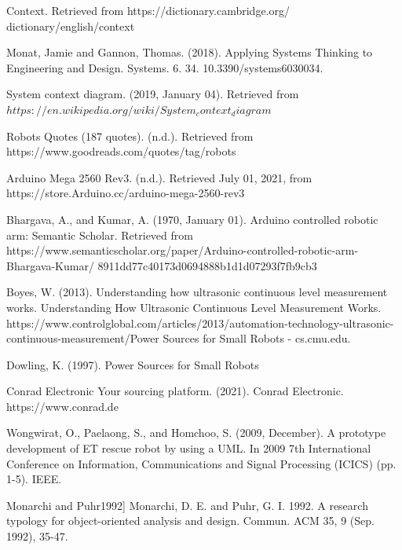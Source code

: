\documentclass[10pt,journal,compsoc]{IEEEtran}
\begin{document}
\begin{thebibliography}{9}

Context. Retrieved from {https://dictionary.cambridge.org/
dictionary/english/context}


Monat, Jamie and Gannon, Thomas. (2018). Applying Systems Thinking to Engineering and Design. Systems. 6. 34. 10.3390/systems6030034.

System context diagram. (2019, January 04). Retrieved from {$https://en.wikipedia.org/wiki/System_context_diagram$}

Robots Quotes (187 quotes). (n.d.). Retrieved from {https://www.goodreads.com/quotes/tag/robots}

Arduino Mega 2560 Rev3. (n.d.). Retrieved July 01, 2021, from https://store.Arduino.cc/arduino-mega-2560-rev3

Bhargava, A., and Kumar, A. (1970, January 01). Arduino controlled robotic arm: Semantic Scholar. Retrieved from https://www.semanticscholar.org/paper/Arduino-controlled-robotic-arm-Bhargava-Kumar/
8911dd77c40173d0694888b1d1d07293f7fb9cb3

Boyes, W. (2013). Understanding how ultrasonic continuous level measurement works. Understanding How Ultrasonic Continuous Level Measurement Works. https://www.controlglobal.com/articles/2013/automation-technology-ultrasonic-continuous-measurement/Power Sources for Small Robots - cs.cmu.edu.

Dowling, K. (1997). Power Sources for Small Robots

Conrad Electronic Your sourcing platform. (2021). Conrad Electronic. https://www.conrad.de

Wongwirat, O., Paelaong, S., and Homchoo, S. (2009, December). A prototype development of ET rescue robot by using a UML. In 2009 7th International Conference on Information, Communications and Signal Processing (ICICS) (pp. 1-5). IEEE.

Monarchi and Puhr1992] Monarchi, D. E. and Puhr, G. I. 1992. A research typology for object-oriented analysis and design. Commun. ACM 35, 9 (Sep. 1992), 35-47.




\end{thebibliography}
\end{document}
